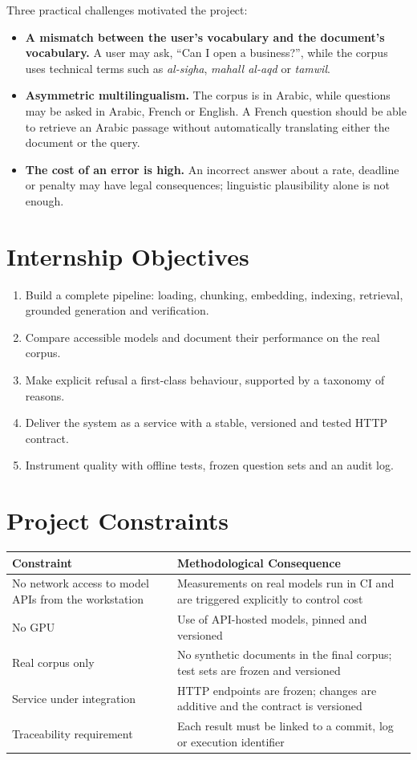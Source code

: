 \documentclass[a4paper,12pt,openany]{report}
\begin{document}
Three practical challenges motivated the project:
\begin{itemize}
  \item \textbf{A mismatch between the user's vocabulary and the document's vocabulary.} A user may
ask, ``Can I open a business?'', while the corpus uses technical terms such as \emph{al-sigha},
\emph{mahall al-aqd} or \emph{tamwil}.
  \item \textbf{Asymmetric multilingualism.} The corpus is in Arabic, while questions may be asked
in Arabic, French or English. A French question should be able to retrieve an Arabic passage
without automatically translating either the document or the query.
  \item \textbf{The cost of an error is high.} An incorrect answer about a rate, deadline or penalty
may have legal consequences; linguistic plausibility alone is not enough.
\end{itemize}

\section{Internship Objectives}
\begin{enumerate}
  \item Build a complete pipeline: loading, chunking, embedding, indexing, retrieval, grounded
generation and verification.
  \item Compare accessible models and document their performance on the real corpus.
  \item Make explicit refusal a first-class behaviour, supported by a taxonomy of reasons.
  \item Deliver the system as a service with a stable, versioned and tested HTTP contract.
  \item Instrument quality with offline tests, frozen question sets and an audit log.
\end{enumerate}

\section{Project Constraints}
\begin{table}[htbp]
\centering
\small
\begin{tabular}{p{6.0cm}p{8.2cm}}
\toprule
\textbf{Constraint} & \textbf{Methodological Consequence} \\
\midrule
No network access to model APIs from the workstation & Measurements on real models run in CI and
are triggered explicitly to control cost \\
No GPU & Use of API-hosted models, pinned and versioned \\
Real corpus only & No synthetic documents in the final corpus; test sets are frozen and versioned \\
Service under integration & HTTP endpoints are frozen; changes are additive and the contract is
versioned \\
Traceability requirement & Each result must be linked to a commit, log or execution identifier \\
\bottomrule
\end{tabular}
\end{table}
\end{document}
